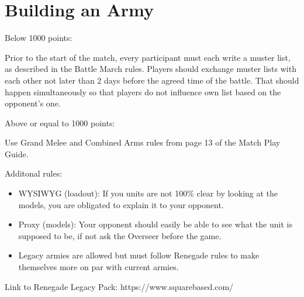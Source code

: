 \section{Building an Army}

Below 1000 points:

Prior to the start of the match, every participant must each write a muster list, as described in the Battle March rules.
Players should exchange muster lists with each other not later than 2 days before the agreed time of the battle. That should happen simultaneously so that players do not influence own list based on the opponent's one.


Above or equal to 1000 points:

Use Grand Melee and Combined Arms rules from page 13 of the Match Play Guide.


Additonal rules:
\begin{itemize}
  \item WYSIWYG (loadout): If you units are not 100\% clear by looking at the models, you are obligated to explain it to your opponent.
  \item Proxy (models): Your opponent should easily be able to see what the unit is supposed to be, if not ask the Overseer before the game.
  \item Legacy armies are allowed but must follow Renegade rules to make themselves more on par with current armies.
\end{itemize}
Link to Renegade Legacy Pack: https://www.squarebased.com/
